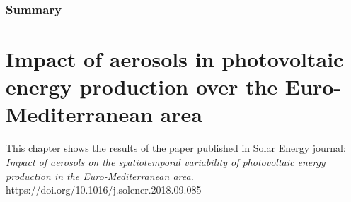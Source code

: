\clearpage

\subsection{Summary}


\chapter{Impact of aerosols in photovoltaic energy production over the Euro-Mediterranean area}

\blfootnote
{This chapter shows the results of the paper published in Solar Energy journal: \textit{Impact of aerosols on the spatiotemporal variability of photovoltaic energy production in the Euro-Mediterranean area.}\\
https://doi.org/10.1016/j.solener.2018.09.085}


\begin{abstract}


  The aim of this work is to assess the influence of aerosols on photovoltaic energy production from seasonal to multi-decadal time scales. For this purpose we use various coupled aerosol-climate simulations that take into account the complex spatial and temporal patterns of natural and anthropogenic aerosols over the Euro-Mediterranean domain.

The results show that aerosols strongly influence the spatial pattern, seasonal cycle and long-term trend of PV production. The most affected area is Central Europe where sensitivity of PV production to aerosols is higher. The annual production loss due to aerosols ranges from no impact to $-16\%$ in The Netherlands, with variation depending on the area and on the typology of the tracking system. The summer production loss can even reach $-20\%$ over regions of Africa and Syria-Iraq.  

We conclude that aerosols can not be neglected in the assessment of PV production at large time scales over the Euro-Mediterranean area. Besides, the potential increase in energy due to reduction in the antrophogenic aerosols is shown in the simulation of the brightening period over Europe, with an increase of 2000 ${\kilo\watthour\over\kilo\wattpeak}$ in a PV lifetime for the most affected areas. It illustrates the evolution that PV potential could follow in highly polluted areas through the effective implementation of pollution control measures.  
  
   
\end{abstract}
 
